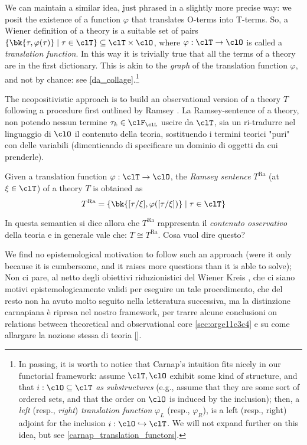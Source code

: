 We can maintain a similar idea, just phrased in a slightly more precise way: we posit the existence of a function $\varphi$ that translates O-terms into T-terms. So, a Wiener definition of a theory is a suitable set of pairs $\{\bk{\tau,\varphi(\tau)} \mid \tau\in\clT\}\subseteq \clT\times\clO$, where $\varphi: \clT \to \clO$ is called a \emph{translation function}. In this way it is trivially true that all the terms of a theory are in the first dictionary. This is akin to the \emph{graph} of the translation function $\varphi$, and not by chance: see \autoref{da_collage}.\footnote{In passing, it is worth to notice that Carnap's intuition fits nicely in our functorial framework: assume $\clT, \clO$ exhibit some kind of structure, and that $i : \clO\subseteq\clT$ \emph{as substructures} (e.g., assume that they are some sort of ordered sets, and that the order on $\clO$ is induced by the inclusion); then, a \emph{left} (resp., \emph{right}) \emph{translation function} $\varphi_L$ (resp., $\varphi_R$), is a left (resp., right) adjoint for the inclusion $i : \clO\hookrightarrow \clT$. We will not expand further on this idea, but see \autoref{carnap_translation_functors}.}

The neopositivistic approach is to build an observational version of a theory $T$ following a procedure first outlined by Ramsey \cite{?}. La Ramsey-sentence of a theory, non potendo nessun termine $\tau_k \in \clF_\clL$ uscire da $\clT$, sia un ri-tradurre nel linguaggio di $\clO$ il contenuto della teoria, sostituendo i termini teorici "puri" con delle variabili (dimenticando di specificare un dominio di oggetti da cui prenderle).
\begin{definition} 
	Given a translation function $\varphi: \clT \to \clO$, the \emph{Ramsey sentence} $T^\text{Ra}$ (at $\xi\in\clT$) of a theory $T$ is obtained as  
	\[ 
		T^\text{Ra} = \{\bk{[\tau/\xi], \varphi([\tau/\xi])} \mid \tau\in\clT\} 
	\]
\end{definition}
In questa semantica si dice allora che $T^\text{Ra}$ rappresenta il \emph{contenuto osservativo} della teoria e in generale vale che: $T \cong T^\text{Ra}$. 
{\color{red} Cosa vuol dire questo?}

\medskip
We find no epistemological motivation to follow such an approach (were it only because it is cumbersome, and it raises more questions than it is able to solve);  Non ci pare, al netto degli obiettivi riduzionistici del Wiener Kreis \cite{}, che ci siano motivi epistemologicamente validi per eseguire un tale procedimento, che del resto non ha avuto molto seguito nella letteratura successiva, ma la distinzione carnapiana è ripresa nel nostro framework, per trarre alcune conclusioni on relations between theoretical and observational core \autoref{sec:orge11c3c4} e su come allargare la nozione stessa di teoria \autoref{}.

